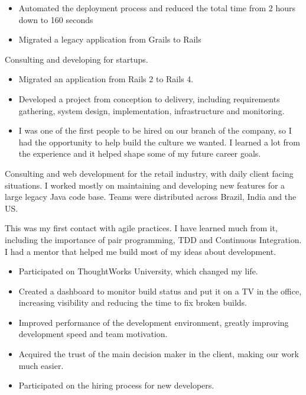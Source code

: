 \documentclass[10pt,a4paper,ragged2e,withhyper]{altacv}
\begin{document}
\begin{paracol}{2}
{\medskip

\begin{itemize}
\item Automated the deployment process and reduced the total time from 2 hours down to 160 seconds
\item Migrated a legacy application from Grails to Rails
\end{itemize}
}

\divider


{\RaggedRight
Consulting and developing for startups.

\medskip

\begin{itemize}
\item Migrated an application from Rails 2 to Rails 4.
\item Developed a project from conception to delivery, including requirements gathering, system design, implementation, infrastructure and monitoring.
\item I was one of the first people to be hired on our branch of the company, so I had the opportunity to help build the culture we wanted. I learned a lot from the experience and it helped shape some of my future career goals.
\end{itemize}
}

\divider


{\RaggedRight
Consulting and web development for the retail industry, with daily client facing situations. I worked mostly on maintaining and developing new features for a large legacy Java code base. Teams were distributed across Brazil, India and the US.

\medskip

This was my first contact with agile practices. I have learned much from it, including the importance of pair programming, TDD and Continuous Integration. I had a mentor that helped me build most of my ideas about development.

\medskip

\begin{itemize}
\item Participated on ThoughtWorks University, which changed my life.
\item Created a dashboard to monitor build status and put it on a TV in the office, increasing visibility and reducing the time to fix broken builds.
\item Improved performance of the development environment, greatly improving development speed and team motivation.
\item Acquired the trust of the main decision maker in the client, making our work much easier.
\item Participated on the hiring process for new developers.
\end{itemize}
}


\end{paracol}
\end{document}
